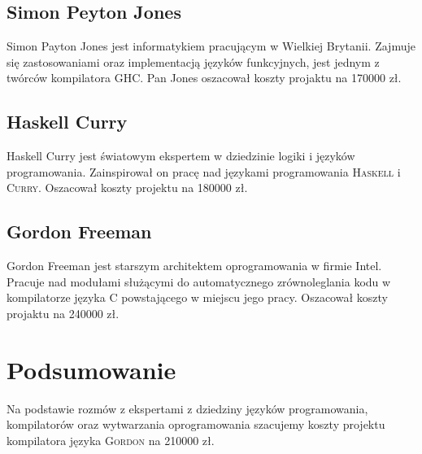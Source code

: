 \documentclass{documentation}
\begin{document}
\subsection{Simon Peyton Jones}
Simon Payton Jones jest informatykiem pracującym w Wielkiej Brytanii. Zajmuje się zastosowaniami
oraz implementacją języków funkcyjnych, jest jednym z twórców kompilatora \textsc{GHC}.
Pan Jones oszacował koszty projaktu na 170000 zł.

\subsection{Haskell Curry}
Haskell Curry jest światowym ekspertem w dziedzinie logiki i języków programowania.
Zainspirował on pracę nad językami programowania \textsc{Haskell} i \textsc{Curry}.
Oszacował koszty projektu na 180000 zł.

\subsection{Gordon Freeman}
Gordon Freeman jest starszym architektem oprogramowania w firmie Intel. Pracuje nad
modułami służącymi do automatycznego zrównoleglania kodu w kompilatorze języka \textsc{C}
powstającego w miejscu jego pracy. Oszacował koszty projaktu na 240000 zł.

\section{Podsumowanie}
Na podstawie rozmów z ekspertami z dziedziny języków programowania, kompilatorów oraz
wytwarzania oprogramowania szacujemy koszty projektu kompilatora języka \textsc{Gordon}
na 210000 zł.
\end{document}
